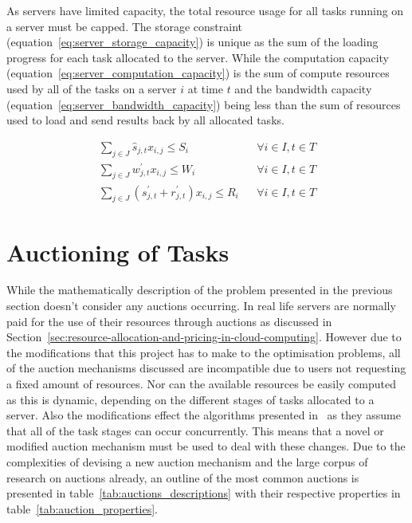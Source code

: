 As servers have limited capacity, the total resource usage for all tasks running on a server must be capped.
The storage constraint (equation~\eqref{eq:server_storage_capacity}) is unique as the sum of the loading progress for
each task allocated to the server. While the computation capacity (equation~\eqref{eq:server_computation_capacity}) is
the sum of compute resources used by all of the tasks on a server $i$ at time $t$ and the bandwidth capacity
(equation~\eqref{eq:server_bandwidth_capacity}) being less than the sum of resources used to load and send results back
by all allocated tasks.

\begin{align}
    \sum_{j \in J} \hat{s}_{j,t} x_{i,j} \leq S_i && \forall{i \in I, t \in T} \label{eq:server_storage_capacity} \\
    \sum_{j \in J} w^{'}_{j,t} x_{i,j} \leq W_i && \forall{i \in I, t \in T} \label{eq:server_computation_capacity} \\
    \sum_{j \in J} (s^{'}_{j,t} + r^{'}_{j,t}) x_{i,j} \leq R_i && \forall{i \in I, t \in T} \label{eq:server_bandwidth_capacity}
\end{align}

\section{Auctioning of Tasks}
\label{sec:auctioning-of-tasks}
While the mathematically description of the problem presented in the previous section doesn't consider any auctions
occurring. In real life servers are normally paid for the use of their resources through auctions as discussed in
Section~\ref{sec:resource-allocation-and-pricing-in-cloud-computing}. However due to the modifications
that this project has to make to the optimisation problems, all of the auction mechanisms discussed are incompatible
due to users not requesting a fixed amount of resources. Nor can the available resources be easily computed as this is
dynamic, depending on the different stages of tasks allocated to a server. Also the modifications effect the algorithms
presented in~\cite{FlexibleResourceAllocation} as they assume that all of the task stages can occur concurrently. This
means that a novel or modified auction mechanism must be used to deal with these changes. Due to the complexities of
devising a new auction mechanism and the large corpus of research on auctions already, an outline of the most common
auctions is presented in table~\ref{tab:auctions_descriptions} with their respective properties in
table~\ref{tab:auction_properties}.

